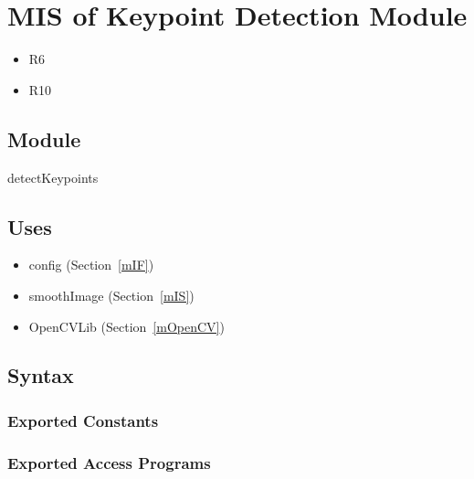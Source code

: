 \documentclass[12pt, titlepage]{article}
\begin{document}
\section{MIS of Keypoint Detection Module} \label{mKD}
\begin{itemize}
  \item R6
  \item R10
\end{itemize}

\subsection{Module}
detectKeypoints

\subsection{Uses}
\begin{itemize}
  \item config (Section~\ref{mIF})
  \item smoothImage (Section~\ref{mIS}) %
  \item OpenCVLib (Section~\ref{mOpenCV})
\end{itemize}

\subsection{Syntax}

\subsubsection{Exported Constants}

\subsubsection{Exported Access Programs}
\end{document}
